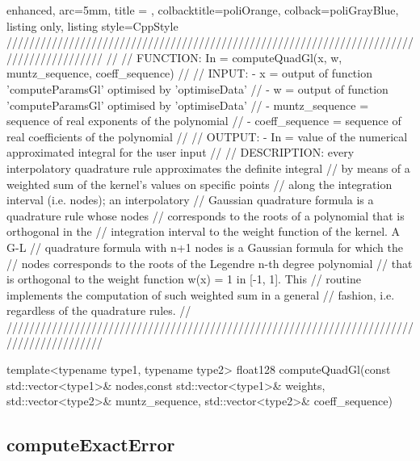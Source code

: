 \documentclass[a4paper, twosided]{book}
\begin{document}
\begin{tcblisting}{enhanced,
                   arc=5mm,
                   title = \color{black}{\large \ttfamily MonMap.cpp/computeQuadGl},
                   colbacktitle=poliOrange,
                   colback=poliGrayBlue,
                   listing only,
                   listing style=CppStyle}
/////////////////////////////////////////////////////////////////////////////////////////
//
//       FUNCTION: In = computeQuadGl(x, w, muntz_sequence, coeff_sequence)
//                
//          INPUT: - x = output of function 'computeParamsGl' optimised by 'optimiseData'
//                 - w = output of function 'computeParamsGl' optimised by 'optimiseData'
//                 - muntz_sequence = sequence of real exponents of the polynomial
//                 - coeff_sequence = sequence of real coefficients of the polynomial
//
//         OUTPUT: - In = value of the numerical approximated integral for the user input
//
//    DESCRIPTION: every interpolatory quadrature rule approximates the definite integral
//                 by means of a weighted sum of the kernel's values on specific points
//                 along the integration interval (i.e. nodes); an interpolatory
//                 Gaussian quadrature formula is a quadrature rule whose nodes 
//                 corresponds to the roots of a polynomial that is orthogonal in the 
//                 integration interval to the weight function of the kernel. A G-L 
//                 quadrature formula with n+1 nodes is a Gaussian formula for which the
//                 nodes corresponds to the roots of the Legendre n-th degree polynomial
//                 that is orthogonal to the weight function w(x) = 1 in [-1, 1]. This 
//                 routine implements the computation of such weighted sum in a general 
//                 fashion, i.e. regardless of the quadrature rules.
//
/////////////////////////////////////////////////////////////////////////////////////////

template<typename type1, typename type2>
float128 computeQuadGl(const std::vector<type1>& nodes,const std::vector<type1>& weights, std::vector<type2>& muntz_sequence, std::vector<type2>& coeff_sequence)
\end{tcblisting}

\subsection[computeExactError]{\changefont computeExactError}\label{SubSec4.1.6}
\end{document}
